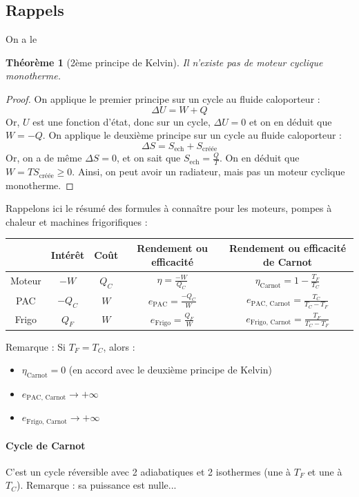 \documentclass[french]{book}
\theoremstyle{plain}
\newtheorem{thm}{Théorème}
\theoremstyle{definition}
\theoremstyle{remark}
\begin{document}
\subsection{Rappels}
On a le \begin{thm}[2ème principe de Kelvin]
	Il n'existe pas de moteur cyclique monotherme.
\end{thm}
\begin{proof}
	On applique le premier principe sur un cycle au fluide caloporteur : $$\Delta U=W+Q$$Or, $U$ est une fonction d'état, donc sur un cycle, $\Delta U=0$ et on en déduit que $W=-Q$. On applique le deuxième principe sur un cycle au fluide caloporteur : $$\Delta S=S_\text{ech}+S_\text{créée}$$Or, on a de même $\Delta S=0$, et on sait que $S_\text{ech}=\displaystyle\frac{Q}{T}$. On en déduit que $W=TS_\text{créée}\geqslant0$. Ainsi, on peut avoir un radiateur, mais pas un moteur cyclique monotherme.
\end{proof}
Rappelons ici le résumé des formules à connaître pour les moteurs, pompes à chaleur et machines frigorifiques : 
\begin{center}
	\begin{tabular}{|c|c|c|c|c|}
	\hline
	&Intérêt&Coût&Rendement ou efficacité&Rendement ou efficacité de Carnot\\[3mm]
	\hline
	Moteur&$-W$&$Q_C$&$\displaystyle\eta=\frac{-W}{Q_C}$&$\displaystyle\eta_\text{Carnot}=1-\frac{T_F}{T_C}$ \\[5mm]
	\hline
	PAC&$-Q_C$&$W$&$\displaystyle e_\text{PAC}=\frac{-Q_C}{W}$&$\displaystyle e_\text{PAC, Carnot}=\frac{T_C}{T_C-T_F}$ \\[5mm]
	\hline
	Frigo&$Q_F$&$W$&$\displaystyle e_\text{Frigo}=\frac{Q_F}{W}$&$\displaystyle e_\text{Frigo, Carnot}=\frac{T_F}{T_C-T_F}$ \\[5mm]
	\hline
\end{tabular}
\end{center}
Remarque : Si $T_F=T_C$, alors : \begin{itemize}
	\item $\eta_\text{Carnot}=0$ (en accord avec le deuxième principe de Kelvin)
	\item $e_\text{PAC, Carnot}\longrightarrow +\infty$
	\item $e_\text{Frigo, Carnot}\longrightarrow +\infty$
\end{itemize}
\paragraph{Cycle de Carnot} C'est un cycle réversible avec 2 adiabatiques et 2 isothermes (une à $T_F$ et une à $T_C$). Remarque : sa puissance est nulle...
\end{document}
